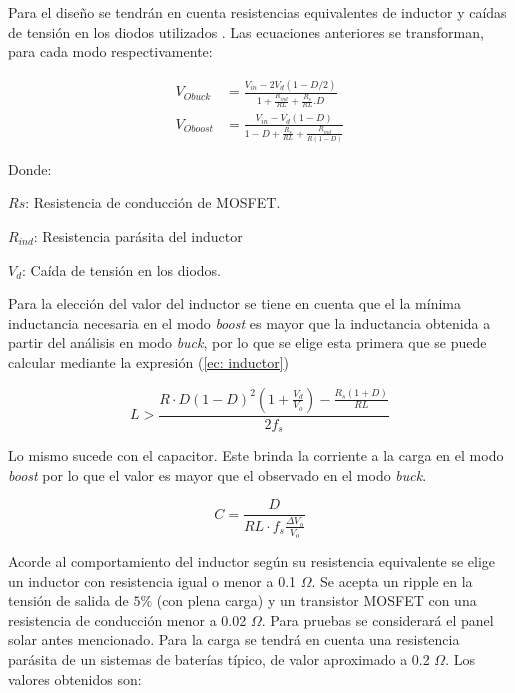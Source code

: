         Para el diseño se tendrán en cuenta resistencias equivalentes de inductor y caídas de tensión en los diodos utilizados \cite{espinosa2017asynchronous}. Las ecuaciones anteriores se transforman, para cada modo respectivamente: 
        
        \begin{align}
            V_{Obuck} & = \frac{V_{in} - 2V_d (1- D/2) }{ 1 + \frac{R_{ind}}{RL} + \frac{R_s}{RL}.D} \\ 
            V_{Oboost} &= \frac{V_{in} - V_d (1-D)  }{ 1 - D + \frac{R_s}{RL} + \frac{R_{ind}}{R (1 - D) }}
        \end{align}
    
        Donde: 
        
        $Rs$: Resistencia de conducción de MOSFET. 
        
        $R_{ind}$: Resistencia parásita del inductor 
        
        $V_d$: Caída de tensión en los diodos. 
        
        Para la elección del valor del inductor se tiene en cuenta que el la mínima inductancia necesaria en el modo \textit{boost} es mayor que la inductancia obtenida a partir del análisis en modo \textit{buck}, por lo que se elige esta primera que se puede calcular mediante la expresión (\ref{ec: inductor}) 
        
    \begin{equation}
        L > \frac{ R \cdot D (1-D)^2 (1 + \tfrac{V_d}{V_o}) - \tfrac{R_s (1+D)}{RL} }{2f_s}
        \label{ec: inductor}
    \end{equation}
    
    Lo mismo sucede con el capacitor. Este brinda la corriente a la carga en el modo \textit{boost} por lo que el valor es mayor que el observado en el modo \textit{buck}. 
    
    \begin{equation}
       C = \frac{D}{RL \cdot f_s \tfrac{\Delta V_o}{V_o}}
        \label{ec: capacitor}
    \end{equation}
    
    Acorde al comportamiento del inductor según su resistencia equivalente se elige un inductor con resistencia igual o menor a 0.1 $\Omega$. Se acepta un ripple en la tensión de salida de $5\%$ (con plena carga) y un transistor MOSFET con una resistencia de conducción menor a 0.02 $\Omega$. Para pruebas se considerará el panel solar antes mencionado. Para la carga se tendrá en cuenta una resistencia parásita de un sistemas de baterías típico, de valor aproximado a 0.2 $\Omega$. Los valores obtenidos son: 
    
